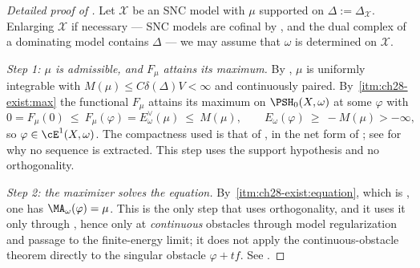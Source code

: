 \begin{proof}[Detailed proof of ]
Let $\mathcal X$ be an SNC model with $\mu$ supported on
$\Delta:=\Delta_{\mathcal X}$.  Enlarging $\mathcal X$ if necessary --- SNC
models are cofinal by , and the dual complex of a
dominating model contains $\Delta$ --- we may assume that $\omega$ is
determined on $\mathcal X$.

\emph{Step 1: $\mu$ is admissible, and $F_\mu$ attains its maximum.}
By , $\mu$ is uniformly integrable with
$M(\mu)\leq C\delta(\Delta)V<\infty$ and continuously paired.  By
\,\cref{itm:ch28-exist:max} the
functional $F_\mu$ attains its maximum on $\PSH_0(X,\omega)$ at some
$\varphi$ with
\[
 0=F_\mu(0)\ \leq\ F_\mu(\varphi)=E^\vee_\omega(\mu)\ \leq\ M(\mu),
 \qquad
 E_\omega(\varphi)\ \geq\ -M(\mu)>-\infty ,
\]
so $\varphi\in\cE^1(X,\omega)$.  The compactness used is that of
, in the net form of
; see  for why no
sequence is extracted.  This step uses the support hypothesis and no
orthogonality.

\emph{Step 2: the maximizer solves the equation.}  By
\,\cref{itm:ch28-exist:equation}, which
is , one has
$\MA_\omega(\varphi)=\mu$.  This is the only step that uses
orthogonality, and it uses it only through
, hence only at \emph{continuous}
obstacles through model regularization and passage to the
finite-energy limit; it does not apply the continuous-obstacle theorem
directly to the singular obstacle $\varphi+tf$.
See .


\end{proof}
